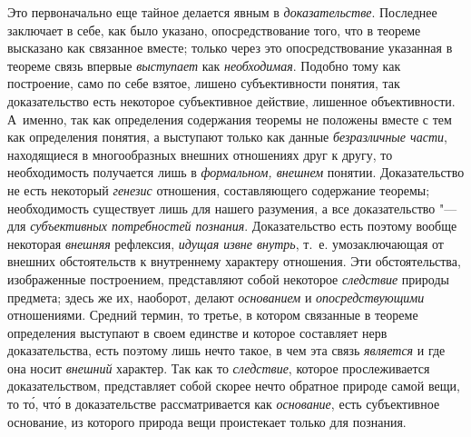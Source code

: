 Это первоначально еще тайное делается явным в
{\em доказательстве}.
Последнее заключает в себе, как было указано,
опосредствование того, что в теореме высказано как связанное вместе; только
через это опосредствование указанная в теореме связь впервые
{\em выступает} как
{\em необходимая}.
Подобно тому как построение, само по себе взятое, лишено
субъективности понятия, так доказательство есть некоторое субъективное
действие, лишенное объективности. А~именно, так как определения содержания
теоремы не положены вместе с тем как определения понятия, а выступают
только как данные {\em безразличные
части}, находящиеся в многообразных внешних отношениях друг
к другу, то необходимость получается лишь в
{\em формальном, внешнем}
понятии. Доказательство не есть некоторый
{\em генезис} отношения,
составляющего содержание теоремы; необходимость существует лишь для нашего
разумения, а все доказательство "--- для
{\em субъективных потребностей
познания}. Доказательство есть поэтому вообще некоторая
{\em внешняя} рефлексия,
{\em идущая извне внутрь},
т.~е. умозаключающая от внешних обстоятельств к внутреннему
характеру отношения. Эти обстоятельства, изображенные построением,
представляют собой некоторое
{\em следствие} природы
предмета; здесь же их, наоборот, делают
{\em основанием} и
{\em опосредствующими}
отношениями. Средний термин, то третье, в котором связанные в
теореме определения выступают в своем единстве и которое составляет нерв
доказательства, есть поэтому лишь нечто такое, в чем эта связь
{\em является} и где она
носит {\em внешний}
характер. Так как то
{\em следствие}, которое
прослеживается доказательством, представляет собой скорее нечто обратное
природе самой вещи, то т\'{о}, чт\'{о} в доказательстве рассматривается как
{\em основание}, есть
субъективное основание, из которого природа вещи проистекает только для
познания.

